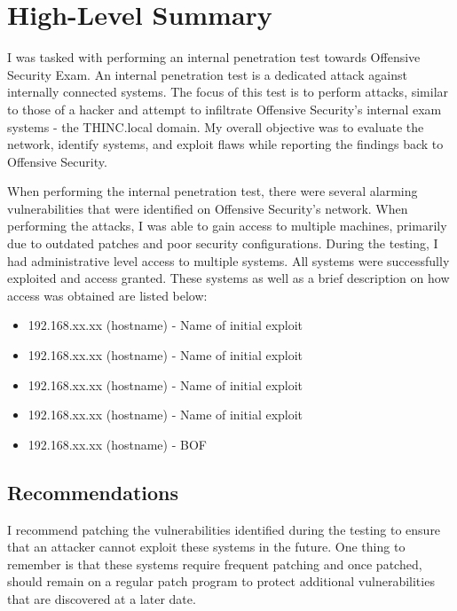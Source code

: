 \hypertarget{high-level-summary}{%
\section{High-Level Summary}\label{high-level-summary}}

I was tasked with performing an internal penetration test towards
Offensive Security Exam. An internal penetration test is a dedicated
attack against internally connected systems. The focus of this test is
to perform attacks, similar to those of a hacker and attempt to
infiltrate Offensive Security's internal exam systems - the THINC.local
domain. My overall objective was to evaluate the network, identify
systems, and exploit flaws while reporting the findings back to
Offensive Security.

When performing the internal penetration test, there were several
alarming vulnerabilities that were identified on Offensive Security's
network. When performing the attacks, I was able to gain access to
multiple machines, primarily due to outdated patches and poor security
configurations. During the testing, I had administrative level access to
multiple systems. All systems were successfully exploited and access
granted. These systems as well as a brief description on how access was
obtained are listed below:

\begin{itemize}
\tightlist
\item
  192.168.xx.xx (hostname) - Name of initial exploit
\item
  192.168.xx.xx (hostname) - Name of initial exploit
\item
  192.168.xx.xx (hostname) - Name of initial exploit
\item
  192.168.xx.xx (hostname) - Name of initial exploit
\item
  192.168.xx.xx (hostname) - BOF
\end{itemize}

\hypertarget{recommendations}{%
\subsection{Recommendations}\label{recommendations}}

I recommend patching the vulnerabilities identified during the testing
to ensure that an attacker cannot exploit these systems in the future.
One thing to remember is that these systems require frequent patching
and once patched, should remain on a regular patch program to protect
additional vulnerabilities that are discovered at a later date.

